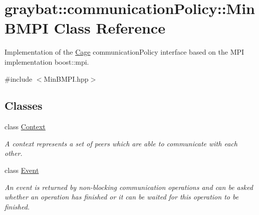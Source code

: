 \hypertarget{structgraybat_1_1communicationPolicy_1_1MinBMPI}{}\section{graybat\+:\+:communication\+Policy\+:\+:Min\+B\+M\+P\+I Class Reference}
\label{structgraybat_1_1communicationPolicy_1_1MinBMPI}


Implementation of the \hyperlink{structgraybat_1_1Cage}{Cage} communication\+Policy interface based on the M\+P\+I implementation boost\+::mpi.  




{\ttfamily \#include $<$Min\+B\+M\+P\+I.\+hpp$>$}

\subsection*{Classes}
\begin{DoxyCompactItemize}
\item 
class \hyperlink{classgraybat_1_1communicationPolicy_1_1MinBMPI_1_1Context}{Context}
\begin{DoxyCompactList}\small\item\em A context represents a set of peers which are able to communicate with each other. \end{DoxyCompactList}\item 
class \hyperlink{classgraybat_1_1communicationPolicy_1_1MinBMPI_1_1Event}{Event}
\begin{DoxyCompactList}\small\item\em An event is returned by non-\/blocking communication operations and can be asked whether an operation has finished or it can be waited for this operation to be finished. \end{DoxyCompactList}\end{DoxyCompactItemize}
